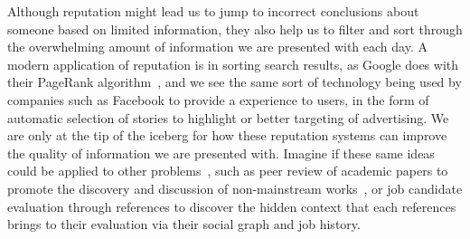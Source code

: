 Although reputation might lead us to jump to incorrect conclusions about
someone based on limited information, they also help us to filter and
sort through the overwhelming amount of information we are presented
with each day.
A modern application of reputation is in sorting search
results, as Google does with their PageRank algorithm~\cite{Page1999},
and we see the same sort of technology being used by companies such
as Facebook to provide a  experience to users,
in the form of automatic selection of stories to highlight or
better targeting of advertising.
We are only at the tip of the iceberg for how these reputation systems
can improve the quality of information we are presented with.
Imagine if these same ideas could be applied to other problems~\cite{Adler2011b},
such as peer review of academic papers to promote the discovery and
discussion of non-mainstream works~\cite{Adler2010a},
or job candidate evaluation through references to discover the hidden
context that each references brings to their evaluation via their social
graph and job history.

